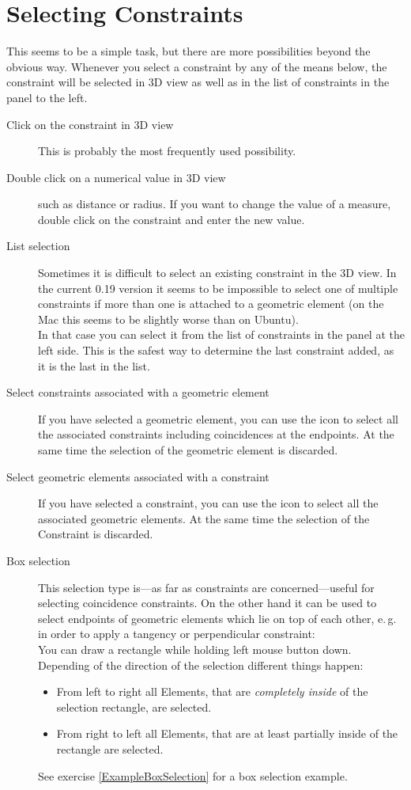 \documentclass[12pt,titlepage]{article}
\newcommand{\icon}[1]{\raisebox{-1em}{\rule{0pt}{27pt}\texttt{[image: images/\#1]}}}
\begin{document}
\section{Selecting Constraints} This seems to be a simple task, but there are more possibilities beyond the obvious way. Whenever you select a constraint by any of the means below, the constraint will be selected in 3D view as well as in the list of constraints in the panel to the left. \begin{description} 
\item [Click on the constraint in 3D view] This is probably the most frequently used possibility. 
\item [Double click on a numerical value in 3D view] such as distance or radius. If you want to change the value of a measure, double click on the constraint and enter the new value. 
\item [List selection] Sometimes it is difficult to select an existing constraint in the 3D view. In the current 0.19 version it seems to be impossible to select one of multiple constraints if more than one is attached to a geometric element (on the Mac this seems to be slightly worse than on Ubuntu).\\ In that case you can select it from the list of constraints in the panel at the left side. This is the safest way to determine the last constraint added, as it is the last in the list. 
\item [Select constraints associated with a geometric element] If you have selected a geometric element, you can use the icon \icon{Sketcher_SelectConstraints} to select all the associated constraints including coincidences at the endpoints. At the same time the selection of the geometric element is discarded. 
\item [Select geometric elements associated with a constraint] If you have selected a constraint, you can use the icon \icon{Sketcher_SelectElementsAssociatedWithConstraints} to select all the associated geometric elements. At the same time the selection of the Constraint is discarded. 
\item [Box selection] This selection type is---as far as constraints are concerned---useful for selecting coincidence constraints. On the other hand it can be used to select endpoints of geometric elements which lie on top of each other, e.\,g. in order to apply a tangency or perpendicular constraint:\\ You can draw a rectangle while holding left mouse button down. Depending of the direction of the selection different things happen: 
\begin{itemize} 
\item From left to right all Elements, that are \emph{completely inside} of the selection rectangle, are selected. 
\item From right to left all Elements, that are at least partially inside of the rectangle are selected. 
\end{itemize} 
	
	See exercise \vref{ExampleBoxSelection} for a box selection example. \end{description}
\end{document}
